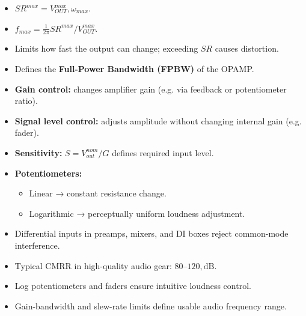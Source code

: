 \begin{tcolorbox}[colback=gray!10,colframe=black,title=Summary: Slew Rate & Full-Power Bandwidth]
\begin{itemize}
\item $\displaystyle SR^{max} = V_{OUT}^{max},\omega_{max}$.
\item $\displaystyle f_{max} = \frac{1}{2\pi} SR^{max} / V_{OUT}^{max}$.
\item Limits how fast the output can change; exceeding $SR$ causes distortion.
\item Defines the \textbf{Full-Power Bandwidth (FPBW)} of the OPAMP.
\end{itemize}
\end{tcolorbox}

\begin{tcolorbox}[colback=gray!10,colframe=black,title=Summary: Gain & Signal Level Control]
\begin{itemize}
\item \textbf{Gain control:} changes amplifier gain (e.g. via feedback or potentiometer ratio).
\item \textbf{Signal level control:} adjusts amplitude without changing internal gain (e.g. fader).
\item \textbf{Sensitivity:} $S = V_{out}^{nom}/G$ defines required input level.
\item \textbf{Potentiometers:}
\begin{itemize}
\item Linear → constant resistance change.
\item Logarithmic → perceptually uniform loudness adjustment.
\end{itemize}
\end{itemize}
\end{tcolorbox}

\begin{tcolorbox}[colback=gray!10,colframe=black,title=Summary: Audio Applications]
\begin{itemize}
\item Differential inputs in preamps, mixers, and DI boxes reject common-mode interference.
\item Typical CMRR in high-quality audio gear: $80$–$120,\text{dB}$.
\item Log potentiometers and faders ensure intuitive loudness control.
\item Gain-bandwidth and slew-rate limits define usable audio frequency range.
\end{itemize}
\end{tcolorbox}
